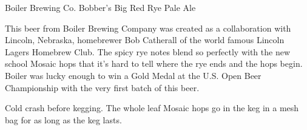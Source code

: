 \stylesection{\styleamericanale}

\begin{recipie}{Boiler Brewing Co. Bobber's Big Red Rye Pale Ale}

\begin{aboutblock}
This beer from Boiler Brewing Company was created as a collaboration with Lincoln,
Nebraska, homebrewer Bob Catherall of the world famous Lincoln Lagers Homebrew Club.
The spicy rye notes blend so perfectly with the new school Mosaic hops that it's hard
to tell where the rye ends and the hops begin. Boiler was lucky enough to win a Gold
Medal at the U.S. Open Beer Championship with the very first batch of this beer.
\end{aboutblock}


\begin{methodandtiming}
 
\begin{mashsteps}
\end{mashsteps}

\begin{fermentationsteps}
\end{fermentationsteps}

\begin{directions}
Cold crash before kegging. The whole leaf Mosaic hops go in the keg in a mesh bag
for as long as the keg lasts.
\end{directions}

\end{methodandtiming}

\pagebreak

\begin{ingredientsblock}

\begin{malts}
\end{malts}

\begin{hops}
\end{hops}

\begin{yeasts}
\end{yeasts}

\end{ingredientsblock}

\end{recipie}

